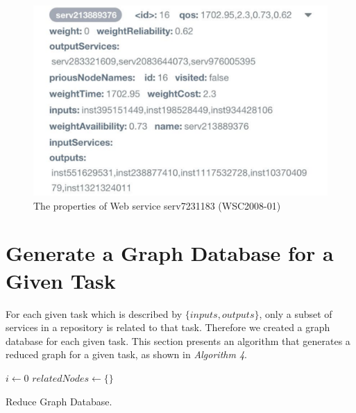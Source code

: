 \begin{figure}[H]
\includegraphics[scale = 0.53]{The-properties-of-Web-service-serv213889376.pdf}
\centering
\caption{The properties of Web service serv7231183 (WSC2008-01)}
\label{fig:servProp} 
\end{figure} 

\section{Generate a Graph Database for a Given Task}
For each given task which is described by $\{inputs, outputs\}$, only a subset of services in a repository is related to that task. Therefore we created a graph database for each given task. This section presents an algorithm that generates a reduced graph for a given task, as shown in \emph{Algorithm 4}. \\

\begin{algorithm}[H]
 \LinesNumbered
 \SetNlSty{}{}{:}
 $i \leftarrow 0$\;
 $relatedNodes \leftarrow \{\}$\;
 \caption{\footnotesize Reduce Graph Database.}
\label{generation}
\end{algorithm}
\setlength{\textfloatsep}{20pt}%

